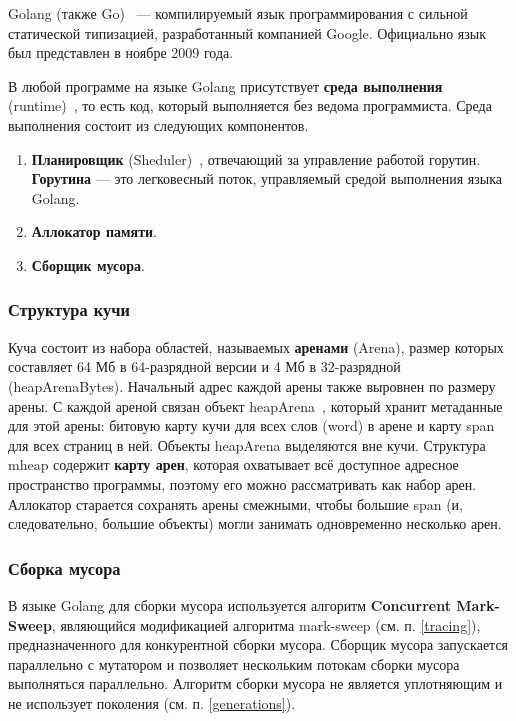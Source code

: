 Golang (также Go)~\cite{golang} --- компилируемый язык программирования с сильной статической типизацией, разработанный компанией Google. Официально язык был представлен в ноябре 2009 года.

В любой программе на языке Golang присутствует \textbf{среда выполнения} (runtime)~\cite{golang_runtime}, то есть код, который выполняется без ведома программиста. Среда выполнения состоит из следующих компонентов.

\begin{enumerate}[label*=\arabic*.]
	\item \textbf{Планировщик} (Sheduler)~\cite{golang_scheduler}, отвечающий за управление работой горутин. \textbf{Горутина} --- это легковесный поток, управляемый средой выполнения языка Golang.~\cite{golang_goroutine}
	\item \textbf{Аллокатор памяти}.
	\item \textbf{Сборщик мусора}.
\end{enumerate}

\subsubsection*{Структура кучи}

Куча состоит из набора областей, называемых \textbf{аренами} (Arena), размер которых составляет 64 Мб в 64-разрядной версии и 4 Мб в 32-разрядной (heapArenaBytes). Начальный адрес каждой арены также выровнен по размеру арены.  С каждой ареной связан объект heapArena~\cite{golang_mheap}, который хранит метаданные для этой арены: битовую карту кучи для всех слов (word) в арене и карту span для всех страниц в ней. Объекты heapArena выделяются вне кучи. Структура mheap содержит \textbf{карту арен}, которая охватывает всё доступное адресное пространство программы, поэтому его можно рассматривать как набор арен. Аллокатор старается сохранять арены смежными, чтобы большие span (и, следовательно, большие объекты) могли занимать одновременно несколько арен.~\cite{golang_malloc}

\subsubsection*{Сборка мусора}

В языке Golang для сборки мусора используется алгоритм \textbf{Concurrent Mark-Sweep}, являющийся модификацией алгоритма mark-sweep (см. п. \ref{tracing}), предназначенного для конкурентной сборки мусора. Сборщик мусора запускается параллельно с мутатором и позволяет нескольким потокам сборки мусора выполняться параллельно. Алгоритм сборки мусора не является уплотняющим и не использует поколения (см. п. \ref{generations}).~\cite{golang_gc}


